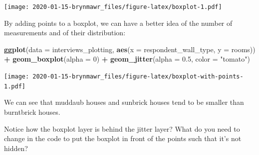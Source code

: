 \documentclass[]{book}
\newenvironment{Shaded}{\begin{snugshade}}{\end{snugshade}}
\newcommand{\KeywordTok}[1]{\textcolor[rgb]{0.13,0.29,0.53}{\textbf{#1}}}
\newcommand{\DataTypeTok}[1]{\textcolor[rgb]{0.13,0.29,0.53}{#1}}
\newcommand{\DecValTok}[1]{\textcolor[rgb]{0.00,0.00,0.81}{#1}}
\newcommand{\FloatTok}[1]{\textcolor[rgb]{0.00,0.00,0.81}{#1}}
\newcommand{\StringTok}[1]{\textcolor[rgb]{0.31,0.60,0.02}{#1}}
\newcommand{\OperatorTok}[1]{\textcolor[rgb]{0.81,0.36,0.00}{\textbf{#1}}}
\newcommand{\NormalTok}[1]{#1}
\begin{document}
\texttt{[image: 2020-01-15-brynmawr\_files/figure-latex/boxplot-1.pdf]}

By adding points to a boxplot, we can have a better idea of the number
of measurements and of their distribution:

\begin{Shaded}
\begin{Highlighting}[]
\KeywordTok{ggplot}\NormalTok{(}\DataTypeTok{data =}\NormalTok{ interviews_plotting, }\KeywordTok{aes}\NormalTok{(}\DataTypeTok{x =}\NormalTok{ respondent_wall_type, }\DataTypeTok{y =}\NormalTok{ rooms)) }\OperatorTok{+}
\StringTok{    }\KeywordTok{geom_boxplot}\NormalTok{(}\DataTypeTok{alpha =} \DecValTok{0}\NormalTok{) }\OperatorTok{+}
\StringTok{    }\KeywordTok{geom_jitter}\NormalTok{(}\DataTypeTok{alpha =} \FloatTok{0.5}\NormalTok{, }\DataTypeTok{color =} \StringTok{"tomato"}\NormalTok{)}
\end{Highlighting}
\end{Shaded}

\texttt{[image: 2020-01-15-brynmawr\_files/figure-latex/boxplot-with-points-1.pdf]}

We can see that muddaub houses and sunbrick houses tend to be smaller
than burntbrick houses.

Notice how the boxplot layer is behind the jitter layer? What do you
need to change in the code to put the boxplot in front of the points
such that it's not hidden?
\end{document}
